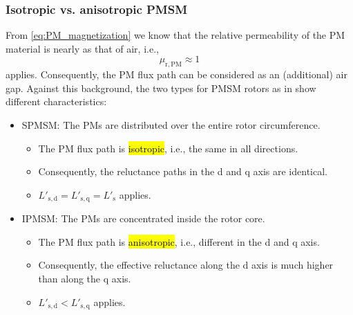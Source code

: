 \begin{frame}
	\frametitle{Isotropic vs. anisotropic PMSM}
	\onslide<+->
	From \eqref{eq:PM_magnetization} we know that the relative permeability of the PM material is nearly as that of air, i.e., $$\mu_\mathrm{r,PM} \approx 1$$ applies. \onslide<+-> Consequently, the PM flux path can be considered as an (additional) air gap. Against this background, the two types for PMSM rotors as in  show different characteristics:
	\vspace{0.5em}
	\begin{itemize}
		\item<+-> SPMSM: The PMs are distributed over the entire rotor circumference.
		      \begin{itemize}
			      \item<+-> The PM flux path is \hl{isotropic}, i.e., the same in all directions.
			      \item<+-> Consequently, the reluctance paths in the d and q axis are identical.
			      \item<+-> $L'_\mathrm{s,d} =  L'_\mathrm{s,q} =L'_\mathrm{s}$ applies.
		      \end{itemize}
		      \vspace{0.5em}
		\item<+-> IPMSM: The PMs are concentrated inside the rotor core.
		      \begin{itemize}
			      \item<+-> The PM flux path is \hl{anisotropic}, i.e., different in the d and q axis.
			      \item<+-> Consequently, the effective reluctance along the d axis is much higher than along the q axis.
			      \item<+-> $L'_\mathrm{s,d} <  L'_\mathrm{s,q}$ applies.
		      \end{itemize}
	\end{itemize}
\end{frame}

